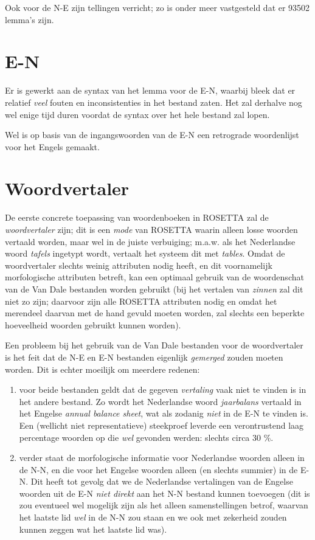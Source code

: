 Ook voor de N-E zijn tellingen verricht; zo is onder meer vastgesteld dat er
93502 lemma's zijn.

\section{E-N}

Er is gewerkt aan de syntax van het lemma voor de E-N, waarbij bleek dat er
relatief {\em veel} fouten en inconsistenties in het bestand zaten. Het
zal derhalve nog wel enige tijd duren voordat de syntax over het hele bestand
zal lopen.

Wel is op basis van de ingangswoorden van de E-N 
een retrograde woordenlijst voor het Engels gemaakt.

\section{Woordvertaler}

De eerste concrete toepassing van woordenboeken in ROSETTA zal de 
{\em woordvertaler} zijn; dit is een {\em mode} van ROSETTA waarin alleen losse 
woorden vertaald worden, maar wel in de juiste verbuiging; m.a.w. als
het Nederlandse woord {\em tafels} ingetypt wordt, vertaalt het systeem dit met
{\em tables}. Omdat de woordvertaler slechts weinig attributen nodig heeft,
en dit voornamelijk morfologische attributen betreft, kan een optimaal gebruik
van de woordenschat van de Van Dale bestanden 
worden gebruikt (bij het vertalen van 
{\em zinnen} zal dit niet zo zijn; daarvoor zijn alle ROSETTA
attributen nodig en omdat het merendeel daarvan met de hand gevuld 
moeten worden, zal slechts een beperkte hoeveelheid woorden gebruikt 
kunnen worden).

Een probleem bij het gebruik van de Van Dale bestanden voor de woordvertaler
is het feit dat de N-E en E-N bestanden eigenlijk {\em gemerged} zouden moeten 
worden. Dit is echter moeilijk om meerdere redenen: 
\begin{enumerate}
   \item voor beide bestanden geldt dat de gegeven {\em vertaling} vaak niet
         te vinden is in het andere bestand. Zo wordt het Nederlandse woord
         {\em jaarbalans} vertaald in het Engelse {\em annual balance sheet},
         wat als zodanig {\em niet} in de E-N te vinden is. Een
         (wellicht niet representatieve) steekproef leverde een verontrustend
         laag percentage woorden op die {\em wel} gevonden werden: 
         slechts circa 30 \%.
   \item verder staat de morfologische informatie voor Nederlandse woorden 
         alleen in de N-N, en die voor het Engelse woorden alleen (en slechts 
         summier) in de E-N. Dit heeft tot gevolg dat we de Nederlandse 
         vertalingen van de Engelse woorden uit de E-N {\em niet direkt} aan het
         N-N bestand kunnen toevoegen (dit is zou eventueel wel mogelijk zijn 
         als het alleen samenstellingen betrof, waarvan het laatste lid
         {\em wel} in de N-N zou staan en we ook met zekerheid zouden kunnen 
         zeggen wat het laatste lid was).
\end{enumerate}

